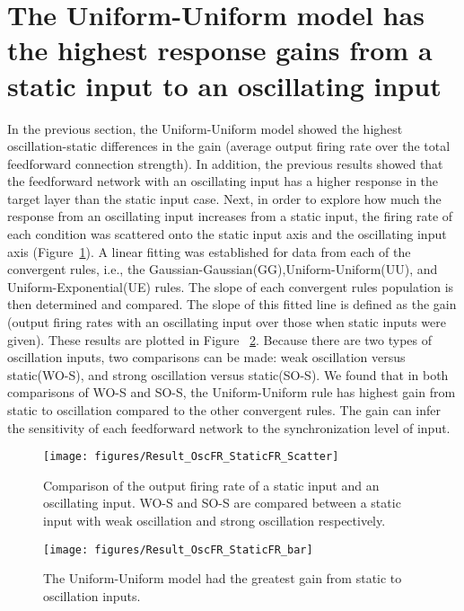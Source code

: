 \section{The Uniform-Uniform model has the highest response gains from a static input to an oscillating input}
 In the previous section, the Uniform-Uniform model showed the highest oscillation-static differences in the gain (average output firing rate over the total feedforward connection strength). In addition, the previous results showed that the feedforward network with an oscillating input has a higher response in the target layer than the static input case.  
Next, in order to explore how much the response from an oscillating input increases from a static input, the firing rate of each condition was scattered onto the static input axis and the oscillating input axis (Figure~\ref{fig:ResFunDiffOscS}). A linear fitting was established for data from each of the convergent rules, i.e., the Gaussian-Gaussian(GG),Uniform-Uniform(UU), and Uniform-Exponential(UE) rules. The slope of each convergent rules population is then determined and compared. The slope of this fitted line is defined as the gain (output firing rates with an oscillating input over those when static inputs were given). These results are plotted in Figure ~\ref{fig:ResFunDiffOscS_hp}. Because there are two types of oscillation inputs, two comparisons can be made: weak oscillation versus static(WO-S), and strong oscillation versus static(SO-S). We found that in both comparisons of WO-S and SO-S, the Uniform-Uniform rule has highest gain from static to oscillation compared to the other convergent rules. The gain can infer the sensitivity of each feedforward network to the synchronization level of input. 



\begin{figure}[!h]
	\centering
	\texttt{[image: figures/Result\_OscFR\_StaticFR\_Scatter]}
	\caption{Comparison of the output firing rate of a static input and an oscillating input. WO-S and SO-S are compared between a static input with weak oscillation and strong oscillation respectively.}
	\label{fig:ResFunDiffOscS}
\end{figure}


\begin{figure}[!h]
	\centering
	\texttt{[image: figures/Result\_OscFR\_StaticFR\_bar]}
	\caption{The Uniform-Uniform model had the greatest gain from static to oscillation inputs.}
	\label{fig:ResFunDiffOscS_hp}
\end{figure}

